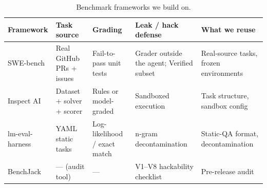 \begin{table}[t]
\centering
\small
\caption{Benchmark frameworks we build on.}
\label{tab:frameworks}
\begin{tabularx}{\textwidth}{@{}lXXXX@{}}
\toprule
\textbf{Framework} & \textbf{Task source} & \textbf{Grading} & \textbf{Leak / hack defense} & \textbf{What we reuse} \\
\midrule
SWE-bench & Real GitHub PRs + issues & Fail-to-pass unit tests & Grader outside the agent; Verified subset & Real-source tasks, frozen environments \\
Inspect AI & Dataset + solver + scorer & Rules or model-graded & Sandboxed execution & Task structure, sandbox config \\
lm-eval-harness & YAML static tasks & Log-likelihood / exact match & n-gram decontamination & Static-QA format, decontamination \\
BenchJack & --- (audit tool) & --- & V1--V8 hackability checklist & Pre-release audit \\
\bottomrule
\end{tabularx}
\end{table}
